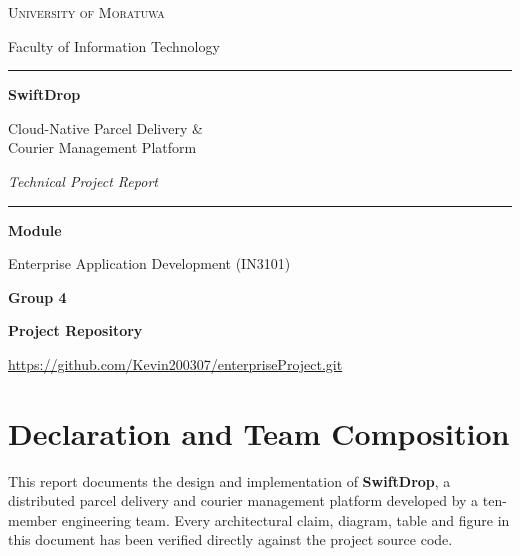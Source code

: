 \documentclass[11pt,a4paper,oneside,openany]{report}
\newcommand{\UniversityName}{University of Moratuwa}
\newcommand{\FacultyName}{Faculty of Information Technology}
\newcommand{\ModuleName}{Enterprise Application Development (IN3101)}
\newcommand{\RepoUrl}{https://github.com/Kevin200307/enterpriseProject.git}
\begin{document}
\begin{titlepage}
\centering
\vspace*{1.2cm}
{\Large\scshape \UniversityName\par}
\vspace{0.4cm}
{\large \FacultyName\par}
\vspace{2.0cm}
{\rule{\linewidth}{1.2pt}}\par
\vspace{1.0cm}
{\Huge\bfseries SwiftDrop\par}
\vspace{0.5cm}
{\LARGE Cloud-Native Parcel Delivery \&\\[6pt] Courier Management Platform\par}
\vspace{0.8cm}
{\large\itshape Technical Project Report\par}
\vspace{1.0cm}
{\rule{\linewidth}{1.2pt}}\par
\vspace{2.0cm}

{\large\textbf{Module}\par}
\vspace{0.25cm}
{\large \ModuleName\par}

\vspace{1.2cm}
{\large\textbf{Group 4}\par}

\vspace{1.4cm}
{\large\textbf{Project Repository}\par}
\vspace{0.25cm}
{\small\url{\RepoUrl}\par}

\vfill
\end{titlepage}

\chapter*{Declaration and Team Composition}

This report documents the design and implementation of \textbf{SwiftDrop}, a distributed
parcel delivery and courier management platform developed by a ten-member engineering team.
Every architectural claim, diagram, table and figure in this document has been verified
directly against the project source code.
\end{document}
